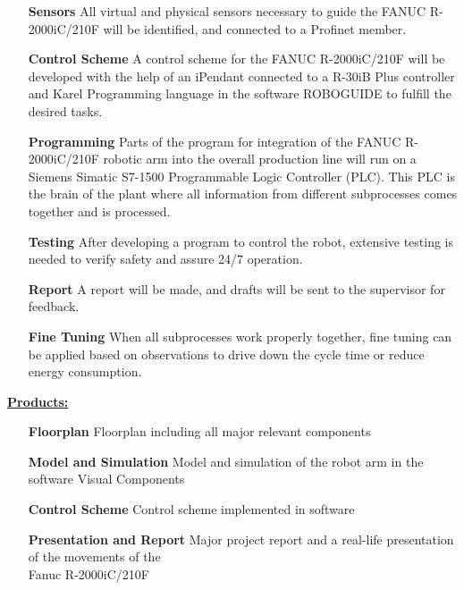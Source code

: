 \begin{itemize}[leftmargin=5cm]
	\item[\textbf{Sensors}] All virtual and physical sensors necessary to guide the FANUC R-2000iC/210F will be identified, and connected to a Profinet member.
	\item[\textbf{Control Scheme}] A control scheme for the FANUC R-2000iC/210F will be developed with the help of an iPendant connected to a R-30iB Plus controller and Karel Programming language in the software ROBOGUIDE to fulfill the desired tasks. 
	\item[\textbf{Programming}] Parts of the program for integration of the FANUC R-2000iC/210F robotic arm into the overall production line will run on a Siemens Simatic S7-1500 Programmable Logic Controller (PLC). This PLC is the brain of the plant where all information from different subprocesses comes together and is processed.
	\item[\textbf{Testing}] After developing a program to control the robot, extensive testing is needed to verify safety and assure 24/7 operation.
	\item[\textbf{Report}] A report will be made, and drafts will be sent to the supervisor for feedback.	
	\item[\textbf{Fine Tuning}] When all subprocesses work properly together, fine tuning can be applied based on observations to drive down the cycle time or reduce energy consumption. 
\end{itemize}
\bigskip
\underline{\textbf{Products:}}\vspace{2mm}
\begin{itemize}[leftmargin=5cm]
	\item[\textbf{Floorplan}] Floorplan including all major relevant components
	\item[\textbf{Model and Simulation}] Model and simulation of the robot arm in the software Visual Components
	\item[\textbf{Control Scheme}] Control scheme implemented in software 
	\item[\textbf{Presentation and Report}] Major project report and a real-life presentation of the movements of the \\Fanuc R-2000iC/210F
\end{itemize}
%
